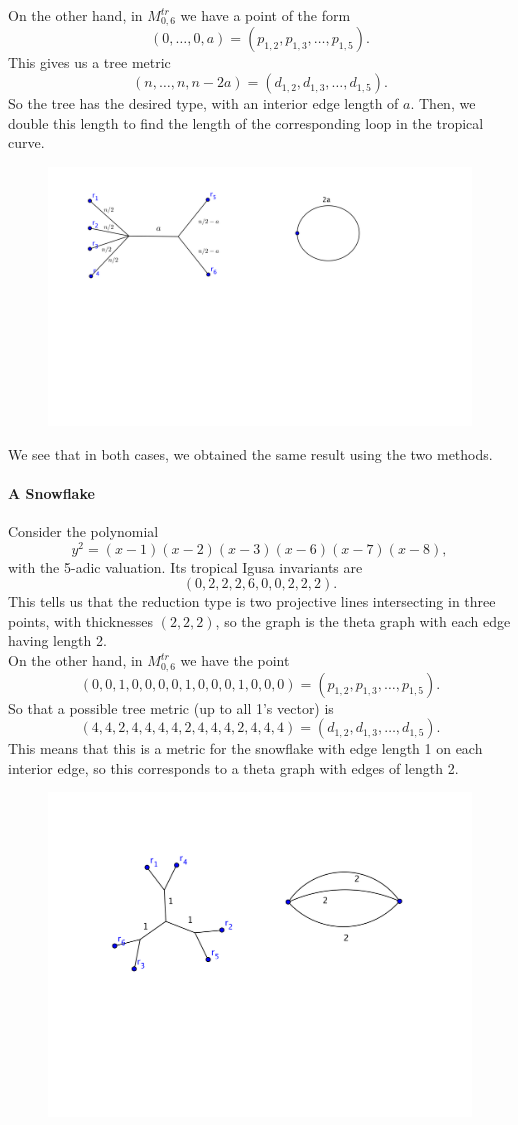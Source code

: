 On the other hand, in $M_{0,6}^{tr}$ we have a point of the form
$$
(0,\ldots,0,a)=(p_{1,2}, p_{1,3}, \ldots, p_{1,5}).
$$
 This gives us a tree metric
$$
(n,\ldots, n, n-2a)=(d_{1,2}, d_{1,3}, \ldots, d_{1,5}).
$$
So the tree has the desired type, with an interior edge length of $a$. Then, we double this length to find the length of the corresponding loop in the tropical curve.
 \begin{figure}[h]
\centering
  \includegraphics[width=.7\linewidth]{../Curves/ex-2-madeline-brandt/ex1.pdf}
\end{figure}

We see that in both cases, we obtained the same result using the two methods.
 
 
 
\paragraph{A Snowflake}

Consider the polynomial
$$
y^2 = (x-1)(x-2)(x-3)(x-6)(x-7)(x-8),
$$
with the 5-adic valuation.
Its tropical Igusa invariants are
$$(0, 2, 2, 2, 6, 0, 0, 2, 2, 2).$$
 This tells us that the reduction type is two projective lines intersecting in three points, with thicknesses $(2,2,2)$, so the graph is the theta graph with each edge having length 2.\\

On the other hand, in $M_{0,6}^{tr}$ we have the point
$$
(0, 0, 1, 0, 0, 0, 0, 1, 0, 0, 0, 1, 0, 0, 0) = (p_{1,2}, p_{1,3}, \ldots, p_{1,5}).
$$
So that a possible tree metric (up to all 1's vector) is
$$
(4, 4, 2, 4, 4, 4, 4, 2, 4, 4, 4, 2, 4, 4, 4) =  (d_{1,2}, d_{1,3}, \ldots, d_{1,5}).
$$
This means that this is a metric for the snowflake with edge length 1 on each interior edge, so this corresponds to a theta graph with edges of length 2.


 \begin{figure}[h]
\centering
  \includegraphics[width=.75\linewidth]{../Curves/ex-2-madeline-brandt/ex2.pdf}
\end{figure}


